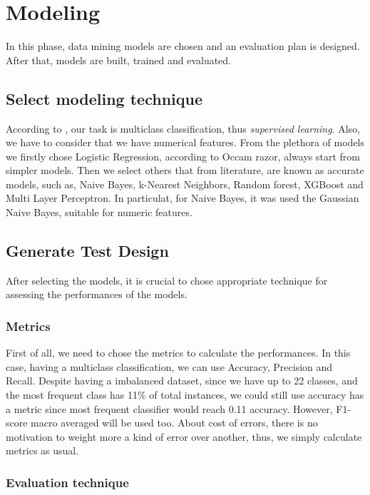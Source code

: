 \section{Modeling}

In this phase, data mining models are chosen and an evaluation plan is designed. After that, models are built, trained and evaluated.
\subsection{Select modeling technique}

According to , our task is multiclass classification, thus \textit{supervised learning}. Also, we have to consider that we have numerical features. From the plethora of models we firstly chose Logistic Regression, according to Occam razor, always start from simpler models. Then we select others that from literature, are known as accurate models, such as, Naive Bayes, k-Nearest Neighbors, Random forest, XGBoost and Multi Layer Perceptron. 
In particulat, for Naive Bayes, it was used the Gaussian Naive Bayes, suitable for numeric features.


\subsection{Generate Test Design}

After selecting the models, it is crucial to chose appropriate technique for assessing the performances of the models.

\subsubsection{Metrics}

First of all, we need to chose the metrics to calculate the performances. In this case, having a multiclass classification, we can use Accuracy, Precision and Recall. Despite having a imbalanced dataset, since we have up to 22 classes, and the most frequent class has 11\% of total instances, we could still use accuracy has a metric since most frequent classifier would reach 0.11 accuracy. However, F1-score macro averaged will be used too. 
About cost of errors, there is no motivation to weight more a kind of error over another, thus, we simply calculate metrics as usual. 

\subsubsection{Evaluation technique}

